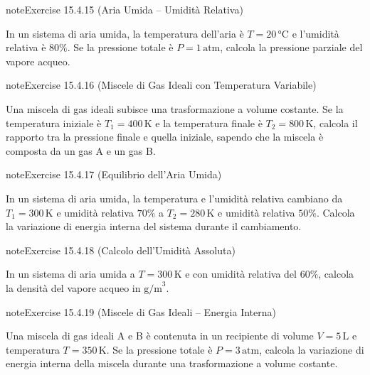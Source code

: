 \documentclass[letterpaper,10pt,italian]{jupyterBook}
\begin{document}
\begin{sphinxadmonition}{note}{Exercise 15.4.15 (Aria Umida – Umidità Relativa)}



\sphinxAtStartPar
In un sistema di aria umida, la temperatura dell’aria è \(T = 20 \, \text{°C}\) e l’umidità relativa è \(80\%\). Se la pressione totale è \(P = 1 \, \text{atm}\), calcola la pressione parziale del vapore acqueo.
\end{sphinxadmonition}
 \label{exercise:ch/thermodynamics/matter-problems-exercise-15}

\begin{sphinxadmonition}{note}{Exercise 15.4.16 (Miscele di Gas Ideali con Temperatura Variabile)}



\sphinxAtStartPar
Una miscela di gas ideali subisce una trasformazione a volume costante. Se la temperatura iniziale è \(T_1 = 400 \, \text{K}\) e la temperatura finale è \(T_2 = 800 \, \text{K}\), calcola il rapporto tra la pressione finale e quella iniziale, sapendo che la miscela è composta da un gas A e un gas B.
\end{sphinxadmonition}
 \label{exercise:ch/thermodynamics/matter-problems-exercise-16}

\begin{sphinxadmonition}{note}{Exercise 15.4.17 (Equilibrio dell’Aria Umida)}



\sphinxAtStartPar
In un sistema di aria umida, la temperatura e l’umidità relativa cambiano da \(T_1 = 300 \, \text{K}\) e umidità relativa \(70\%\) a \(T_2 = 280 \, \text{K}\) e umidità relativa \(50\%\). Calcola la variazione di energia interna del sistema durante il cambiamento.
\end{sphinxadmonition}
 \label{exercise:ch/thermodynamics/matter-problems-exercise-17}

\begin{sphinxadmonition}{note}{Exercise 15.4.18 (Calcolo dell’Umidità Assoluta)}



\sphinxAtStartPar
In un sistema di aria umida a \(T = 300 \, \text{K}\) e con umidità relativa del \(60\%\), calcola la densità del vapore acqueo in \( \text{g/m}^3\).
\end{sphinxadmonition}
 \label{exercise:ch/thermodynamics/matter-problems-exercise-18}

\begin{sphinxadmonition}{note}{Exercise 15.4.19 (Miscele di Gas Ideali – Energia Interna)}



\sphinxAtStartPar
Una miscela di gas ideali A e B è contenuta in un recipiente di volume \(V = 5 \, \text{L}\) e temperatura \(T = 350 \, \text{K}\). Se la pressione totale è \(P = 3 \, \text{atm}\), calcola la variazione di energia interna della miscela durante una trasformazione a volume costante.
\end{sphinxadmonition}
 \label{exercise:ch/thermodynamics/matter-problems-exercise-19}
\end{document}

